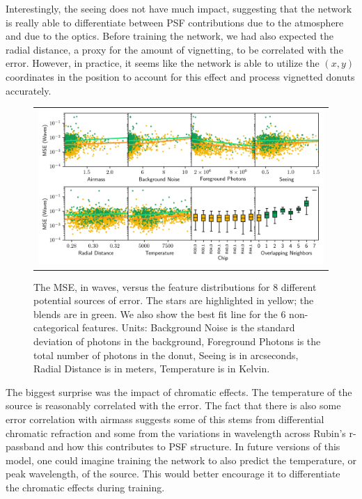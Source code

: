Interestingly, the seeing does not have much impact, suggesting that the network is really able to differentiate between PSF contributions due to the atmosphere and due to the optics. Before training the network, we had also expected the radial distance, a proxy for the amount of vignetting, to be correlated with the error. However, in practice, it seems like the network is able to utilize the $(x,y)$ coordinates in the position to account for this effect and process vignetted donuts accurately.

\begin{figure}[!htbp]
\begin{center}
\begin{tabular}{c}
\includegraphics[width=\textwidth]{figs/cnn/error_analysis.png}
\end{tabular}
\end{center}
\caption[Panel of Potential Sources of Error]{The MSE, in waves, versus the feature distributions for 8 different potential sources of error. The stars are highlighted in yellow; the blends are in green. We also show the best fit line for the 6 non-categorical features. Units: Background Noise is the standard deviation of photons in the background, Foreground Photons is the total number of photons in the donut, Seeing is in arcseconds, Radial Distance is in meters, Temperature is in Kelvin. \label{fig:err_sources}}
\end{figure}

The biggest surprise was the impact of chromatic effects. The temperature of the source is reasonably correlated with the error. The fact that there is also some error correlation with airmass suggests some of this stems from differential chromatic refraction and some from the variations in wavelength across Rubin's r-passband and how this contributes to PSF structure. In future versions of this model, one could imagine training the network to also predict the temperature, or peak wavelength, of the source. This would better encourage it to differentiate the chromatic effects during training.

